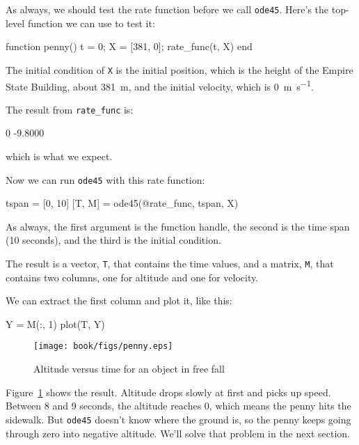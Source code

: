 
As always, we should test the rate function before we call \lstinline{ode45}.  Here's the top-level function we can use to test it:

\begin{code}
function penny()
   t = 0;
   X = [381, 0];
   rate_func(t, X)
end
\end{code}

The initial condition of \lstinline{X} is the initial position, which is the height of the Empire State Building, about \SI{381}{\meter}, and the initial velocity, which is \SI{0}{\meter \per \second}.


The result from \lstinline{rate_func} is:

\begin{code}
    0
   -9.8000
\end{code}
which is what we expect.

Now we can run \lstinline{ode45} with this rate function:

\begin{code}
tspan = [0, 10]
[T, M] = ode45(@rate_func, tspan, X)
\end{code}

As always, the first argument is the function handle, the second
is the time span (10 seconds), and the third is the initial
condition.

The result is a vector, \lstinline{T}, that contains the time values, and a matrix, \lstinline{M}, that contains two columns, one for altitude and one for velocity.

We can extract the first column and plot it, like this:

\begin{code}
Y = M(:, 1)
plot(T, Y)
\end{code}


\begin{figure}
\centerline{\texttt{[image: book/figs/penny.eps]}}
\caption{Altitude versus time for an object in free fall}
\label{fig:penny}
\end{figure}

Figure~\ref{fig:penny} shows the result.  Altitude drops slowly at first and picks up speed.  Between 8 and 9 seconds, the altitude reaches 0, which means the penny hits the sidewalk.  But \lstinline{ode45} doesn't know where the ground is, so the penny keeps going through zero into negative altitude.  We'll solve that problem in the next section.

